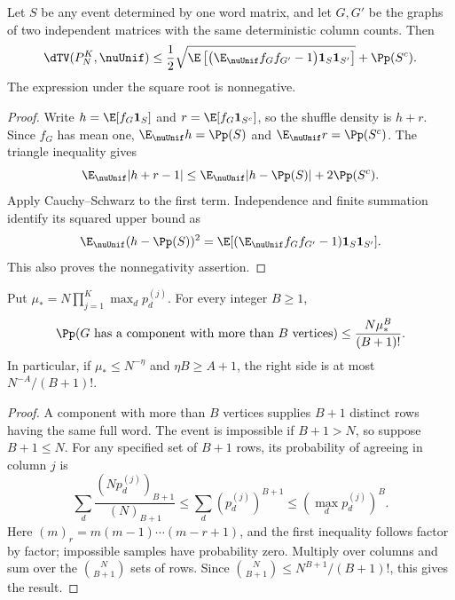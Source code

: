 \begin{lemma}\label{lem:upper-truncation}
Let $S$ be any event determined by one word matrix, and let $G,G'$ be
the graphs of two independent matrices with the same deterministic
column counts. Then
\begin{equation}\label{eq:upper-truncation}
 \dTV(P_N^K,\nuUnif)
 \le\frac12\sqrt{\E\left[
   \bigl(\E_{\nuUnif}f_Gf_{G'}-1\bigr)
                      \mathbf1_S\mathbf1_{S'}\right]}+\Pp(S^c).
\end{equation}
The expression under the square root is nonnegative.
\end{lemma}
\begin{proof}
Write $h=\E[f_G\mathbf1_S]$ and $r=\E[f_G\mathbf1_{S^c}]$,
so the shuffle density is $h+r$. Since $f_G$ has mean one,
$\E_{\nuUnif}h=\Pp(S)$ and $\E_{\nuUnif}r=\Pp(S^c)$.
The triangle inequality gives
\[
 \E_{\nuUnif}|h+r-1|
 \le\E_{\nuUnif}|h-\Pp(S)|+2\Pp(S^c).
\]
Apply Cauchy--Schwarz to the first term. Independence and finite
summation identify its squared upper bound as
\[
 \E_{\nuUnif}(h-\Pp(S))^2
 =\E[(\E_{\nuUnif}f_Gf_{G'}-1)\mathbf1_S\mathbf1_{S'}].
\]
This also proves the nonnegativity assertion.
\end{proof}

\begin{lemma}\label{lem:upper-components}
Put $\mu_*=N\prod_{j=1}^K\max_d p_d^{(j)}$.
For every integer $B\ge1$,
\begin{equation}\label{eq:upper-components}
 \Pp(G\text{ has a component with more than }B\text{ vertices})
       \le\frac{N\mu_*^B}{(B+1)!}.
\end{equation}
In particular, if $\mu_*\le N^{-\eta}$ and $\eta B\ge A+1$,
the right side is at most $N^{-A}/(B+1)!$.
\end{lemma}
\begin{proof}
A component with more than $B$ vertices supplies $B+1$ distinct rows
having the same full word. The event is impossible if $B+1>N$,
so suppose $B+1\le N$.
For any specified set of $B+1$ rows, its probability
of agreeing in column $j$ is
\[
 \sum_d\frac{(Np_d^{(j)})_{B+1}}{(N)_{B+1}}
 \le\sum_d(p_d^{(j)})^{B+1}
 \le(\max_d p_d^{(j)})^B.
\]
Here $(m)_r=m(m-1)\cdots(m-r+1)$, and the first inequality follows
factor by factor; impossible samples have probability zero. Multiply
over columns and sum over the $\binom N{B+1}$ sets of rows.
Since $\binom N{B+1}\le N^{B+1}/(B+1)!$, this gives the result.
\end{proof}

